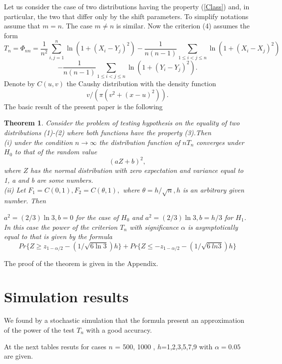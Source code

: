 \documentclass[final,11pt,3p]{elsarticle}
\newtheorem{theorem}{Theorem}
\begin{document}
Let us consider the case of two distributions having the property (\ref{Class}) and, in particular, the two that differ only by the shift parameters. To simplify notations assume that $m=n$. The case $m\ne n$ is similar.
Now the criterion  (4)  assumes the form
\begin{equation}
T_n=\Phi_{nn}= \frac{1}{n^2}\sum_{i,j=1}^n \ln(1 + (X_i - Y_j)^2)-\frac{1}{n(n-1)}\sum_{1\leq i<j\leq n}  \ln(1 + (X_i - X_j)^2)
\end{equation}
\begin{equation}
-  \frac{1}{n(n-1)}\sum_{1\leq i<j\leq n}  \ln(1 + (Y_i - Y_j)^2).
\end{equation}
Denote by $C(u,v)$ the Caushy distribution with the density function
$$
v/(\pi(v^2 + (x-u)^2)).
$$
The basic result of the present paper is the following
\begin{theorem} Consider the problem of testing hypothesis on the equality of two distributions (1)-(2) where both functions have the property (3).Then\\
(i) under the condition $n \to \infty$
the distribution function of $nT_n$  converges under $H_0$ to that of the random value
\begin{equation}\label{Distr}
(aZ + b)^2,
\end{equation}
where  $Z$ has the normal distribution with zero expectation and variance equal to 1, a and
b are some numbers. \\
(ii)
Let $F_1= C(0,1),F_2=C(\theta,1),$
where
$\theta=h/\sqrt{n},h$ is an arbitrary given number. Then

$a^2 =(2/3)\ln 3, b=0$
for the case of $H_0$ and
$a^2= (2/3)\ln 3, b= h/3$
for  $H_1$.
In this case the power of the criterion $T_n$ with significance $\alpha$ is asymptotically equal to that is given by the formula
$$
Pr\{Z\geq z_{1-\alpha/2}-(1/\sqrt{6\ln 3})h\}
+ Pr\{Z\leq - z_{1-\alpha/2}-(1/\sqrt{6\
ln 3})h\}
$$
\end{theorem}


The proof of the theorem is given in the Appendix.


\section{Simulation results}


 We found by a stochastic simulation that the formula present an approximation of the power of the test $T_n$ with a good accuracy.

 At the next tables resuts for cases $n$ = 500, 1000 , $h$=1,2,3,5,7,9 with $\alpha=0.05$ are given.
\end{document}
